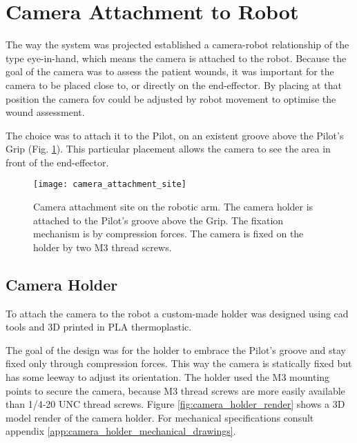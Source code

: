 

\section{Camera Attachment to Robot}
\label{sec:vision_system_camera_attachment}

The way the system was projected established a camera-robot relationship of the type eye-in-hand, which means the camera is attached to the robot. Because the goal of the camera was to assess the patient wounds, it was important for the camera to be placed close to, or directly on the end-effector. By placing at that position the camera \gls{fov} could be adjusted by robot movement to optimise the wound assessment.

The choice was to attach it to the Pilot, on an existent groove above the Pilot's Grip (Fig. \ref{fig:camera_attachment_site}). This particular placement allows the camera to see the area in front of the end-effector.

\begin{figure}[htbp]
	\centering
	\texttt{[image: camera\_attachment\_site]}
	\caption[Camera attachment site on the robotic arm.]{Camera attachment site on the robotic arm. The camera holder is attached to the Pilot's groove above the Grip. The fixation mechanism is by compression forces. The camera is fixed on the holder by two M3 thread screws.}
	\label{fig:camera_attachment_site}
\end{figure}

\subsection{Camera Holder}
\label{subsec:vision_system_camera_attachment_holder}

To attach the camera to the robot a custom-made holder was designed using \gls{cad} tools and 3D printed in PLA thermoplastic. 

The goal of the design was for the holder to embrace the Pilot's groove and stay fixed only through compression forces. This way the camera is statically fixed but has some leeway to adjust its orientation. The holder used the M3 mounting points to secure the camera, because M3 thread screws are more easily available than 1/4‑20 UNC thread screws. Figure \ref{fig:camera_holder_render} shows a 3D model render of the camera holder. For mechanical specifications consult appendix \ref{app:camera_holder_mechanical_drawings}.

